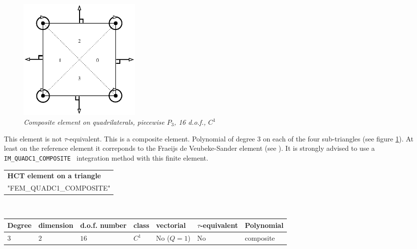 \documentclass[10pt,a4paper]{article}
\begin{document}
\begin{figure}[H]
  \begin{center}
    \includegraphics[width=6cm,angle=0]{getfemlist_quadc1_composite.eps}
  \end{center}
  \caption{ \it Composite element on quadrilaterals, piecewise $P_3$, 16 d.o.f., $C^1$}
  \label{fig:QC1_tr}
\end{figure}

This element is not \mbox{$\tau$-equivalent}. This is a composite element. Polynomial of degree 3 on each of the four sub-triangles (see figure \ref{fig:QC1_tr}). At least on the reference element it correponds to the Fraeijs de Veubeke-Sander element (see \cite{ciarlet1978}). It is strongly advised to use a \texttt{ IM\_QUADC1\_COMPOSITE } integration method with this finite element. \\

\begin{center}
\begin{tabular}{|m{16.11cm}|} \hline 
{ \bf HCT element on a triangle}\\
"FEM\_QUADC1\_COMPOSITE"
\end{tabular} \\ \vspace{-1pt} 
\begin{tabular}{|m{2cm}|m{2cm}|m{2.5cm}|m{1.2cm}|m{2cm}|m{2cm}|m{1.8cm}|} \hline 
Degree & dimension & d.o.f. number & class & vectorial & \mbox{$\tau$-equivalent} & Polynomial \\ \hline
$3$ & $2$ & $16$ & $C^1$ & No \mbox{($Q = 1$)} & No & composite\\ \hline
\end{tabular}
\end{center}
\end{document}
